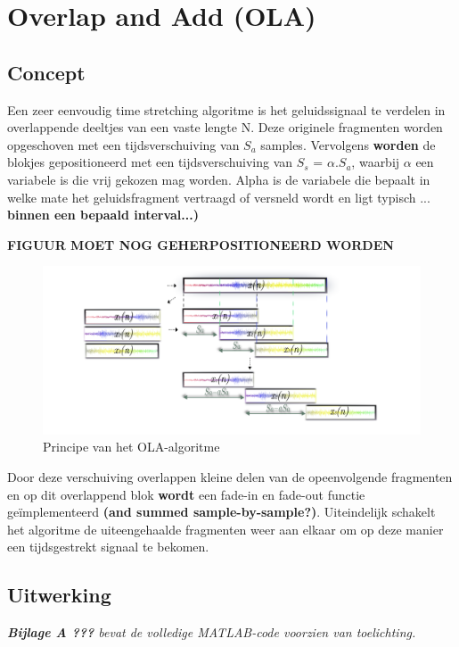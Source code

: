 \documentclass[12pt]{report}
\begin{document}
\section{Overlap and Add (OLA)}
\subsection{Concept}
Een zeer eenvoudig time stretching algoritme is het geluidssignaal te verdelen in overlappende deeltjes van een vaste lengte N. Deze originele fragmenten worden opgeschoven met een tijdsverschuiving van $ S_{a}$ samples. Vervolgens  \textbf{worden}  de blokjes gepositioneerd met een tijdsverschuiving van $S_{s}$ = $\alpha$.$S_{a}$, waarbij $\alpha$ een variabele is die vrij gekozen mag worden. Alpha is de variabele die bepaalt in welke mate het geluidsfragment vertraagd of versneld wordt en ligt typisch ...  \textbf{binnen een bepaald interval...)} 

\textbf{FIGUUR MOET NOG GEHERPOSITIONEERD WORDEN}

\begin{figure}
\centering
\includegraphics[width=\textwidth]{ola}
\caption{Principe van het OLA-algoritme}
\label{fig:OLA}
\end{figure}

Door deze verschuiving overlappen kleine delen van de opeenvolgende fragmenten en op dit overlappend blok \textbf{wordt} een fade-in en fade-out functie ge\"{i}mplementeerd \textbf{(and summed sample-by-sample?)}. Uiteindelijk schakelt het algoritme de uiteengehaalde fragmenten weer aan elkaar om op deze manier een tijdsgestrekt signaal te bekomen.

\subsection{Uitwerking}
{\footnotesize \textit{\textbf{Bijlage A ???} bevat de volledige MATLAB-code voorzien van toelichting.}}\\
\end{document}
